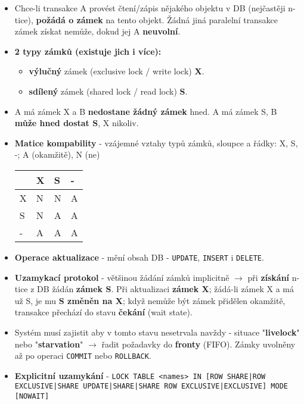 \begin{itemize}
    \item Chce-li transakce A provést čtení/zápis nějakého objektu v DB (nejčastěji n-tice), \textbf{požádá o zámek} na tento objekt. Žádná jiná paralelní transakce zámek získat nemůže, dokud jej A \textbf{neuvolní}.
    \item \textbf{2 typy zámků (existuje jich i více):}
          \begin{itemize}
              \item \textbf{výlučný} zámek (exclusive lock / write lock) \textbf{X}.
              \item \textbf{sdílený} zámek (shared lock / read lock) \textbf{S}.
          \end{itemize}
    \item A má zámek X a B \textbf{nedostane žádný zámek} hned. A má zámek S, B \textbf{může hned dostat S}, X nikoliv.
    \item \textbf{Matice kompability} - vzájemné vztahy typů zámků, sloupce a řádky: X, S, -; A (okamžitě), N (ne)
          \begin{table}[H]
              \centering
              \begin{tabular}{|l|l|l|l|}
                  \hline
                    & X & S & - \\ \hline
                  X & N & N & A \\ \hline
                  S & N & A & A \\ \hline
                  - & A & A & A \\ \hline
              \end{tabular}
          \end{table}
    \item \textbf{Operace aktualizace} - mění obsah DB - \texttt{UPDATE}, \texttt{INSERT} i \texttt{DELETE}.
    \item \textbf{Uzamykací protokol} - většinou žádání zámků implicitně $\rightarrow$ při \textbf{získání} n-tice z DB žádán \textbf{zámek S}. Při aktualizaci \textbf{zámek X}; žádá-li zámek X a má už S, je mu \textbf{S změněn na X}; když nemůže být zámek přidělen okamžitě, transakce přechází do stavu \textbf{čekání} (wait state).
    \item Systém musí zajistit aby v tomto stavu nesetrvala navždy - situace "\textbf{livelock}" nebo "\textbf{starvation}" $\rightarrow$ řadit požadavky do \textbf{fronty} (FIFO). Zámky uvolněny až po operaci \texttt{COMMIT} nebo \texttt{ROLLBACK}.
    \item \textbf{Explicitní uzamykání} - \texttt{LOCK TABLE <names> IN [ROW SHARE|ROW EXCLUSIVE|SHARE UPDATE|SHARE|SHARE ROW EXCLUSIVE|EXCLUSIVE] MODE [NOWAIT]}
\end{itemize}

